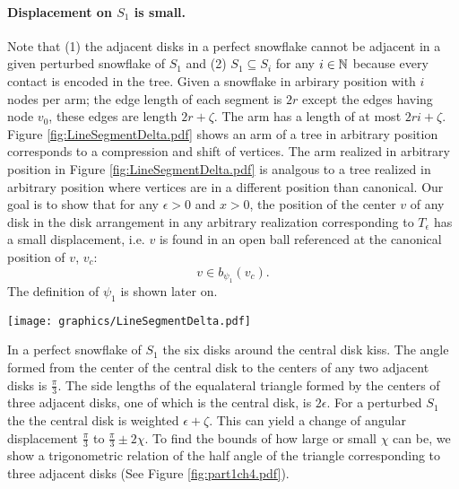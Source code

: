 
\paragraph{Displacement on $S_1$ is small.}
Note that (1) the adjacent disks in a perfect snowflake cannot be adjacent in a given perturbed snowflake of $S_1$ and (2) $S_1 \subseteq S_i$ for any $i \in {\mathbb{N}}$ because every contact is encoded in the tree.  
Given a snowflake in arbirary position with $i$ nodes per arm; the edge length of each segment is $2r$ except the edges having node $v_0$, these edges are length $2r+ \zeta$.  
The arm has a length of at most $2ri+\zeta$.
Figure \ref{fig:LineSegmentDelta.pdf} shows an arm of a tree in arbitrary position corresponds to a compression and shift of vertices.  
The arm realized in arbitrary position in Figure \ref{fig:LineSegmentDelta.pdf} is analgous to a tree realized in arbitrary position where vertices are in a different position than canonical.  
Our goal is to show that for any $\epsilon >0$ and $x >0$, the position of the center $v$ of any disk in the disk arrangement in any arbitrary realization corresponding to $T_\epsilon$ has a small displacement, i.e. $v$ is found in an open ball referenced at the canonical position of $v$, $v_c$: $$v \in b_{\psi_1}(v_c).$$ 
The definition of $\psi_1$ is shown later on.

\begin{minipage}{\linewidth}
\begin{center}
\texttt{[image: graphics/LineSegmentDelta.pdf]}
\label{fig:LineSegmentDelta.pdf}
\end{center}
\end{minipage}
 
In a perfect snowflake of $S_1$ the six disks around the central disk kiss.  
The angle formed from the center of the central disk to the centers of any two adjacent disks is $\frac{\pi}{3}$.  
The side lengths of the equalateral triangle formed by the centers of three adjacent disks, one of which is the central disk, is $2\epsilon$.  
For a perturbed $S_1$ the the central disk is weighted $\epsilon+ \zeta$.  
This can yield a change of angular displacement $\frac{\pi}{3}$ to $\frac{\pi}{3} \pm 2\chi$.  
To find the bounds of how large or small $\chi$ can be, we show a trigonometric relation of the half angle of the triangle corresponding to three adjacent disks (See Figure \ref{fig:part1ch4.pdf}).

